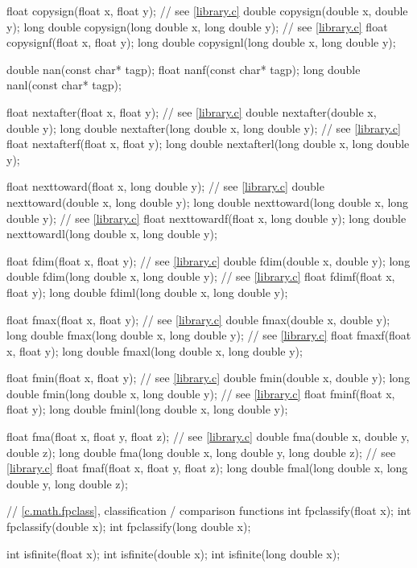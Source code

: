 \begin{codeblock}
{  float copysign(float x, float y);  // see \ref{library.c}
  double copysign(double x, double y);
  long double copysign(long double x, long double y);  // see \ref{library.c}
  float copysignf(float x, float y);
  long double copysignl(long double x, long double y);

  double nan(const char* tagp);
  float nanf(const char* tagp);
  long double nanl(const char* tagp);

  float nextafter(float x, float y);  // see \ref{library.c}
  double nextafter(double x, double y);
  long double nextafter(long double x, long double y);  // see \ref{library.c}
  float nextafterf(float x, float y);
  long double nextafterl(long double x, long double y);

  float nexttoward(float x, long double y);  // see \ref{library.c}
  double nexttoward(double x, long double y);
  long double nexttoward(long double x, long double y);  // see \ref{library.c}
  float nexttowardf(float x, long double y);
  long double nexttowardl(long double x, long double y);

  float fdim(float x, float y);  // see \ref{library.c}
  double fdim(double x, double y);
  long double fdim(long double x, long double y);  // see \ref{library.c}
  float fdimf(float x, float y);
  long double fdiml(long double x, long double y);

  float fmax(float x, float y);  // see \ref{library.c}
  double fmax(double x, double y);
  long double fmax(long double x, long double y);  // see \ref{library.c}
  float fmaxf(float x, float y);
  long double fmaxl(long double x, long double y);

  float fmin(float x, float y);  // see \ref{library.c}
  double fmin(double x, double y);
  long double fmin(long double x, long double y);  // see \ref{library.c}
  float fminf(float x, float y);
  long double fminl(long double x, long double y);

  float fma(float x, float y, float z);  // see \ref{library.c}
  double fma(double x, double y, double z);
  long double fma(long double x, long double y, long double z);  // see \ref{library.c}
  float fmaf(float x, float y, float z);
  long double fmal(long double x, long double y, long double z);

  // \ref{c.math.fpclass}, classification / comparison functions
  int fpclassify(float x);
  int fpclassify(double x);
  int fpclassify(long double x);

  int isfinite(float x);
  int isfinite(double x);
  int isfinite(long double x);

}
\end{codeblock}
